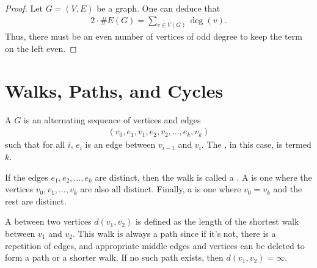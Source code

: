 \begin{proof}
    Let $G = (V,E)$ be a graph. One can deduce that
    \begin{align}
        2 \cdot \# E(G) = \sum_{v \in V(G)} \deg(v).
    \end{align}
    Thus, there must be an even number of vertices of odd degree to keep the term on the left even.
\end{proof}


\section{Walks, Paths, and Cycles}

\begin{definition}
    A  $G$ is an alternating sequence of vertices and edges 
    \begin{align}
        (v_{0},e_{1},v_{1},e_{2},v_{2},\ldots,e_{k},v_{k})
    \end{align}
    such that for all $i$, $e_{i}$ is an edge between $v_{i-1}$ and $v_{i}$. The , in this case, is termed $k$.
\end{definition}


\begin{definition}
    If the edges $e_{1},e_{2},\ldots,e_{k}$ are distinct, then the walk is called a . A  is one where the vertices $v_{0},v_{1},\ldots,v_{k}$ are also all distinct. Finally, a  is one where $v_{0} = v_{k}$ and the rest are distinct.
\end{definition}

A  between two vertices $d(v_{1},v_{2})$ is defined as the length of the shortest walk between $v_{1}$ and $v_{2}$. This walk is always a path since if it's not, there is a repetition of edges, and appropriate middle edges and vertices can be deleted to form a path or a shorter walk. If no such path exists, then $d(v_{1},v_{2}) = \infty$.
